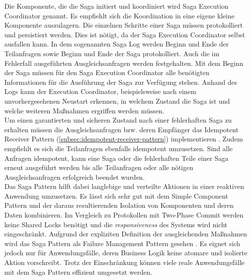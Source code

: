 Die Komponente, die die Saga initiert und koordiniert wird Saga Execution Coordinator genannt. Es empfiehlt sich die Koordination in eine eigene kleine Komponente auszulagern. Die einzelnen Schritte einer Saga müssen protokolliert und persistiert werden. Dies ist nötigt, da der Saga Execution Coordinator selbst ausfallen kann. In dem sogenannten Saga Log werden Beginn und Ende der Teilanfragen sowie Beginn und Ende der Saga protokolliert. Auch die im Fehlerfall ausgeführten Ausgleichsanfragen werden festgehalten. Mit dem Beginn der Saga müssen für den Saga Execution Coordinator alle benötigten Informationen für die Ausführung der Saga zur Verfügung stehen. Anhand des Logs kann der Execution Coordinator, beispielsweise nach einem unvorhergesehenen Neustart erkennen, in welchem Zustand die Saga ist und welche weiteren Maßnahmen ergriffen werden müssen.\\
Um einen garantierten und sicheren Zustand nach einer fehlerhaften Saga zu erhalten müssen die Ausgleichsanfragen bzw. deren Empfänger das Idempotent Receiver Pattern (\ref{subsec:idempotent-receiver-pattern}) implementieren \cite{mccaffrey_goto_2015}. Zudem empfiehlt es sich die Teilanfragen ebenfalls idempotent umzusetzen. Sind alle Anfragen idempotent, kann eine Saga oder die fehlerhaften Teile einer Saga erneut ausgeführt werden bis alle Teilanfragen oder alle nötigen Ausgleichsanfragen erfolgreich beendet wurden.\\

Das Saga Pattern hilft dabei langlebige und verteilte Aktionen in einer reaktiven Anwendung umzusetzen. Es lässt sich sehr gut mit dem Simple Component Pattern und der daraus resultierenden Isolation von Komponenten und deren Daten kombinieren. Im Vergleich zu Protokollen mit Two-Phase Commit werden keine Shared Locks benötigt und die \textit{responsiveness} des Systems wird nicht eingeschränkt. Aufgrund der expliziten Definition der ausgleichenden Maßnahmen wird das Saga Pattern als Failure Management Pattern gesehen \cite{mccaffrey_goto_2015}. Es eignet sich jedoch nur für Anwendungsfälle, deren Business Logik keine atomare und isolierte Aktion vorschreibt. Trotz der Einschränkung können viele reale Anwendungsfälle mit dem Saga Pattern effizient umgesetzt werden.
